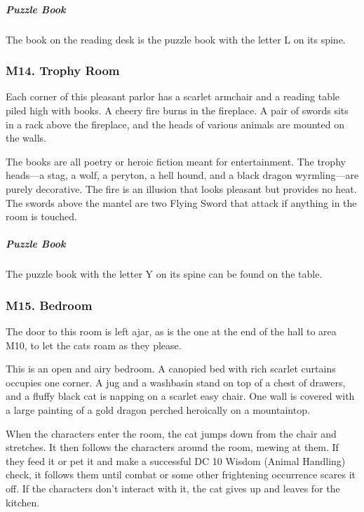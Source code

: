 \documentclass[10pt,a4paper,twoside,bg=print,twocolumn,openany,nodeprecatedcode]{dndbook}
\begin{document}
\subparagraph{Puzzle Book}
The book on the reading desk is the puzzle book with the letter L on its spine.

\subsubsection{M14. Trophy Room}
\begin{DndReadAloud}{}
Each corner of this pleasant parlor has a scarlet armchair and a reading table piled high with books. A cheery fire burns in the fireplace. A pair of swords sits in a rack above the fireplace, and the heads of various animals are mounted on the walls.

\end{DndReadAloud}

The books are all poetry or heroic fiction meant for entertainment. The trophy heads—a stag, a wolf, a peryton, a hell hound, and a black dragon wyrmling—are purely decorative. The fire is an illusion that looks pleasant but provides no heat. The swords above the mantel are two Flying Sword that attack if anything in the room is touched.

\subparagraph{Puzzle Book}
The puzzle book with the letter Y on its spine can be found on the table.

\subsubsection{M15. Bedroom}
The door to this room is left ajar, as is the one at the end of the hall to area M10, to let the cats roam as they please.

\begin{DndReadAloud}{}
This is an open and airy bedroom. A canopied bed with rich scarlet curtains occupies one corner. A jug and a washbasin stand on top of a chest of drawers, and a fluffy black cat is napping on a scarlet easy chair. One wall is covered with a large painting of a gold dragon perched heroically on a mountaintop.

\end{DndReadAloud}

When the characters enter the room, the cat jumps down from the chair and stretches. It then follows the characters around the room, mewing at them. If they feed it or pet it and make a successful DC 10 Wisdom (Animal Handling) check, it follows them until combat or some other frightening occurrence scares it off. If the characters don't interact with it, the cat gives up and leaves for the kitchen.
\end{document}
